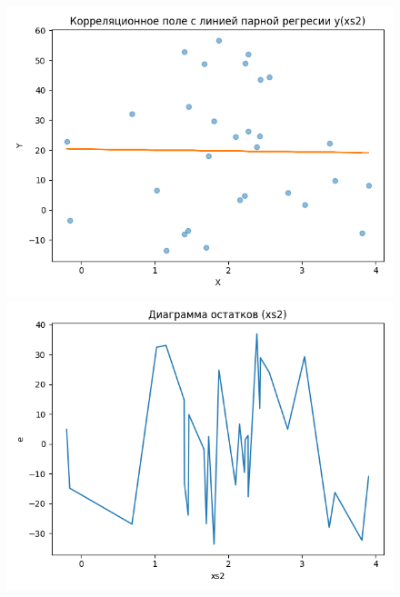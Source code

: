 \begin{figure}[H]
	\begin{minipage}[H]{0.32\linewidth}
		\begin{center}
			\includegraphics[width=\linewidth]{figures/scatter_xs2}
		\end{center}
	\end{minipage}
	\hfill
	\begin{minipage}[H]{0.32\linewidth}
		\begin{center}
			\includegraphics[width=\linewidth]{figures/res_plot_xs2}
		\end{center}
	\end{minipage}
	\hfill
	\begin{minipage}[H]{0.32\linewidth}

\end{minipage}
\end{figure}

